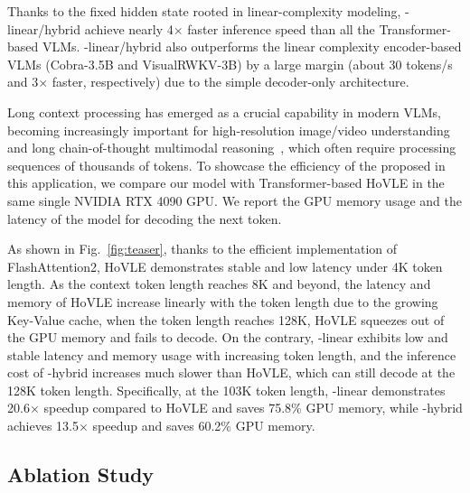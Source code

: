 Thanks to the fixed hidden state rooted in linear-complexity modeling, \name{}-linear/hybrid achieve nearly 4$\times$ faster inference speed than all the Transformer-based VLMs.
\name{}-linear/hybrid also outperforms the linear complexity encoder-based VLMs (Cobra-3.5B and VisualRWKV-3B) by a large margin (about 30 tokens/s and 3$\times$ faster, respectively) due to the simple decoder-only architecture.





Long context processing has emerged as a crucial capability in modern VLMs, becoming increasingly important for high-resolution image/video understanding~\cite{videollm, hrvlm} and long chain-of-thought multimodal reasoning~\cite{llavacot,Lightman2023LetsVS,deepseekr1, s1, k1p5}, which often require processing sequences of thousands of tokens.
To showcase the efficiency of the proposed \name{} in this application, we compare our model with Transformer-based HoVLE in the same single NVIDIA RTX 4090 GPU. We report the GPU memory usage and the latency of the model for decoding the next token.

As shown in Fig.~\ref{fig:teaser}, thanks to the efficient implementation of FlashAttention2, HoVLE demonstrates stable and low latency under 4K token length.
As the context token length reaches 8K and beyond, the latency and memory of HoVLE increase linearly with the token length due to the growing Key-Value cache, when the token length reaches 128K, HoVLE squeezes out of the GPU memory and fails to decode.
On the contrary, \name{}-linear exhibits low and stable latency and memory usage with increasing token length, and the inference cost of \name{}-hybrid increases much slower than HoVLE, which can still decode at the 128K token length.
Specifically, at the 103K token length, \name{}-linear demonstrates 20.6$\times$ speedup compared to HoVLE and saves 75.8\% GPU memory, while \name{}-hybrid achieves 13.5$\times$ speedup and saves 60.2\% GPU memory.



















\subsection{Ablation Study}



